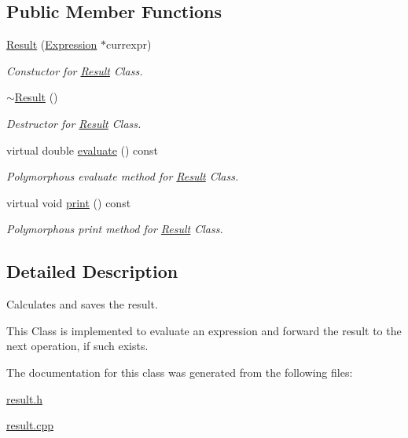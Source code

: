 \subsection*{Public Member Functions}
\begin{DoxyCompactItemize}
\item 
\mbox{\label{class_result_aab8976a9cb715f82a3a28dea71882f04}} 
\hyperlink{class_result_aab8976a9cb715f82a3a28dea71882f04}{Result} (\hyperlink{class_expression}{Expression} $\ast$currexpr)
\begin{DoxyCompactList}\small\item\em Constuctor for \hyperlink{class_result}{Result} Class. \end{DoxyCompactList}\item 
\mbox{\label{class_result_ab83cf33a31236b3da75d66aaf9a05ed0}} 
\hyperlink{class_result_ab83cf33a31236b3da75d66aaf9a05ed0}{$\sim$\+Result} ()
\begin{DoxyCompactList}\small\item\em Destructor for \hyperlink{class_result}{Result} Class. \end{DoxyCompactList}\item 
\mbox{\label{class_result_a107a060722c095f33008ca435cb2397d}} 
virtual double \hyperlink{class_result_a107a060722c095f33008ca435cb2397d}{evaluate} () const
\begin{DoxyCompactList}\small\item\em Polymorphous evaluate method for \hyperlink{class_result}{Result} Class. \end{DoxyCompactList}\item 
\mbox{\label{class_result_a17227de791c97a6eee68689f4317cafa}} 
virtual void \hyperlink{class_result_a17227de791c97a6eee68689f4317cafa}{print} () const
\begin{DoxyCompactList}\small\item\em Polymorphous print method for \hyperlink{class_result}{Result} Class. \end{DoxyCompactList}\end{DoxyCompactItemize}


\subsection{Detailed Description}
Calculates and saves the result. 

This Class is implemented to evaluate an expression and forward the result to the next operation, if such exists. 

The documentation for this class was generated from the following files\+:\begin{DoxyCompactItemize}
\item 
\hyperlink{result_8h}{result.\+h}\item 
\hyperlink{result_8cpp}{result.\+cpp}\end{DoxyCompactItemize}
